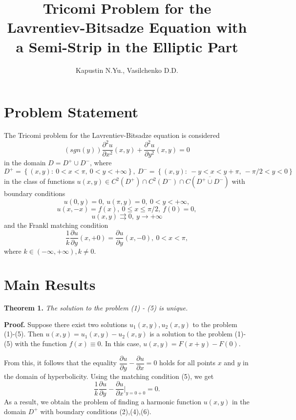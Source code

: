 \documentclass[9pt]{article}
\title{Tricomi Problem for the Lavrentiev-Bitsadze Equation with a Semi-Strip in the Elliptic Part}
\author{Kapustin N.Yu., Vasilchenko D.D.}
\date{}
\begin{document}
	\maketitle
	\section{Problem Statement}
	
	The Tricomi problem for the Lavrentiev-Bitsadze equation is considered
	\begin{equation}
		\left(sgn (y)\right) \dfrac{\partial^2 u}{\partial x^2}(x,y) + \dfrac{\partial^2 u}{\partial y^2}(x,y) = 0
	\end{equation}
	in the domain $D = D^{+} \cup D^{-}$, where $D^{+} = \left\{(x,y): \ 0 < x < \pi, \ 0 < y < + \infty \right\}, \ D^{-} = \left\{(x,y): \ -y < x < y + \pi, \ -\pi/2 < y < 0\right\}$ in the class of functions $u(x,y) \in C^2(D^{+}) \cap C^2(D^{-}) \cap C(\overline{D^{+} \cup D^{-}})$ with boundary conditions
	\begin{equation}
		u(0,y) = 0, \ u(\pi, y) = 0, \ 0 < y < + \infty,
	\end{equation}
	\begin{equation}
		u(x,-x) = f(x) , \ 0 \leq x \leq \pi/2, \ f(0) = 0,
	\end{equation}
	\begin{equation}
		u(x,y) \rightrightarrows 0, \ y \to +\infty
	\end{equation}
	and the Frankl matching condition
	\begin{equation}
		\dfrac1{k} \dfrac{\partial u}{\partial y}(x, +0) = \dfrac{\partial u}{\partial y} (x, -0), \ 0 < x < \pi,
	\end{equation}
	where $k \in (-\infty, +\infty), k \neq 0$.
	\section{Main Results}
	\textbf{Theorem 1.} \textit{The solution to the problem (1) - (5) is unique.}
	
	\textbf{Proof.}
	Suppose there exist two solutions $u_1(x,y), u_2(x,y)$ to the problem (1)-(5). Then $u(x,y) = u_1(x,y) - u_2(x,y)$ is a solution to the problem (1)-(5) with the function $f(x) \equiv 0$. In this case, $u(x,y) = F(x+y) - F(0)$.
	
	From this, it follows that the equality $\dfrac{\partial u}{\partial y} - \dfrac{\partial u}{\partial x} = 0$ holds for all points $x$ and $y$ in the domain of hyperbolicity. Using the matching condition (5), we get
	\begin{equation}
		\dfrac1{k} \dfrac{\partial u}{\partial y} - \dfrac{\partial u}{\partial x}\vert_{y=0+0} = 0.
	\end{equation}
	As a result, we obtain the problem of finding a harmonic function $u(x,y)$ in the domain $D^{+}$ with boundary conditions (2),(4),(6).
	
\end{document}
